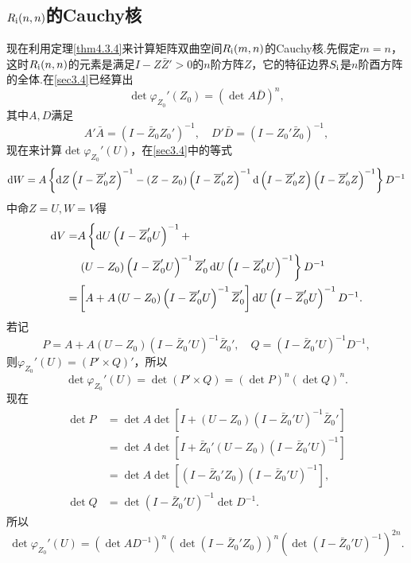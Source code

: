 \subsection{$R_{\text{\uppercase\expandafter{\romannumeral1}}}(n,n)$的Cauchy核}
现在利用定理\ref{thm4.3.4}来计算矩阵双曲空间$R_{\text{\uppercase\expandafter{\romannumeral1}}}(m,n)$的Cauchy核.先假定$m=n$，这时$R_{\text{\uppercase\expandafter{\romannumeral1}}}(n,n)$的元素是满足$I-Z\bar{Z}'>0$的$n$阶方阵$Z$，它的特征边界$S_{\text{\uppercase\expandafter{\romannumeral1}}}$是$n$阶酉方阵的全体.在\ref{sec3.4}已经算出
\begin{equation}\label{eq4.4.1}
	\det\varphi_{Z_0}'(Z_0)=\left(\det A\bar{D}\right)^n,
\end{equation}
其中$A,D$满足
\[A'\bar{A}=\left(I-\bar{Z}_0 Z_0'\right)^{-1},\quad D'\bar{D}=\left(I-Z_0'\bar{Z}_0\right)^{-1},\]
现在来计算$\det\varphi_{Z_0}'(U)$，在\ref{sec3.4}中的等式
\[\mathop{}\!\mathrm{d} W=A\left\{\mathop{}\!\mathrm{d} Z\left(I-{}\mkern1mu\overline{\mkern-1muZ}_0' Z\right)^{-1}-\left(Z-Z_0\right)\left(I-{}\mkern1mu\overline{\mkern-1muZ}_0'Z\right)^{-1}\mathop{}\!\mathrm{d}\left(I-{}\mkern1mu\overline{\mkern-1muZ}_0'Z\right)\left(I-{}\mkern1mu\overline{\mkern-1muZ}_0'Z\right)^{-1}\right\} D^{-1}\]
中命$Z=U,W=V$得
\begin{align*}
	\mathop{}\!\mathrm{d} V
	=&A\left\{\mathop{}\!\mathrm{d} U\left(I-{}\mkern1mu\overline{\mkern-1muZ}_0' U\right)^{-1}+\right.\\
	&\left.\left(U-Z_0\right)\left(I-{}\mkern1mu\overline{\mkern-1muZ}_0' U\right)^{-1}{}\mkern1mu\overline{\mkern-1muZ}_0'\mathop{}\!\mathrm{d} U\left(I-{}\mkern1mu\overline{\mkern-1muZ}_0' U\right)^{-1}\right\}D^{-1}\\
	=&\left[A+A\left(U-Z_0\right)\left(I-{}\mkern1mu\overline{\mkern-1muZ}_0' U\right)^{-1}{}\mkern1mu\overline{\mkern-1muZ}_0'\right]\mathop{}\!\mathrm{d} U\left(I-{}\mkern1mu\overline{\mkern-1muZ}_0' U\right)^{-1} D^{-1}.
\end{align*}
若记
\[P=A+A\left(U-Z_0\right)\left(I-\bar{Z}_0' U\right)^{-1}\bar{Z}_0',\quad Q=\left(I-\bar{Z}_0' U\right)^{-1} D^{-1},\]
则$\varphi_{Z_0}'(U)=\left(P'\times Q\right)'$，所以
\[\det\varphi_{Z_0}'(U)=\det\left(P'\times Q\right)=\left(\det P\right)^n\left(\det Q\right)^n.\]
现在
\begin{align*}
	\det P
	&=\det A\det\left[I+\left(U-Z_0\right)\left(I-\bar{Z}_0' U\right)^{-1}\bar{Z}_0'\right]\\
	&=\det A\det\left[I+\bar{Z}_0'\left(U-Z_0\right)\left(I-\bar{Z}_0' U\right)^{-1}\right]\\
	&=\det A\det\left[\left(I-\bar{Z}_0'Z_0\right)\left(I-\bar{Z}_0'U\right)^{-1}\right],\\
	\det Q&=\det\left(I-\bar{Z}_0' U\right)^{-1}\det D^{-1}.
\end{align*}
所以
\begin{equation}\label{eq4.4.2}
	\det\varphi_{Z_0}'(U)=\left(\det AD^{-1}\right)^n\left(\det\left(I-\bar{Z}_0' Z_0\right)\right)^n\left(\det\left(I-\bar{Z}_0' U\right)^{-1}\right)^{2n}.
\end{equation}
